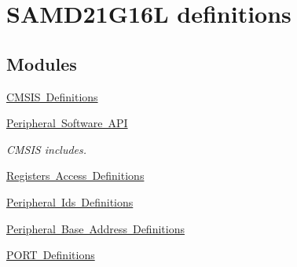 \hypertarget{group___s_a_m_d21_g16_l__definitions}{}\section{S\+A\+M\+D21\+G16L definitions}
\label{group___s_a_m_d21_g16_l__definitions}
\subsection*{Modules}
\begin{DoxyCompactItemize}
\item 
\mbox{\hyperlink{group___s_a_m_d21_g16_l__cmsis}{C\+M\+S\+I\+S Definitions}}
\item 
\mbox{\hyperlink{group___s_a_m_d21_g16_l__api}{Peripheral Software A\+PI}}
\begin{DoxyCompactList}\small\item\em C\+M\+S\+IS includes. \end{DoxyCompactList}\item 
\mbox{\hyperlink{group___s_a_m_d21_g16_l__reg}{Registers Access Definitions}}
\item 
\mbox{\hyperlink{group___s_a_m_d21_g16_l__id}{Peripheral Ids Definitions}}
\item 
\mbox{\hyperlink{group___s_a_m_d21_g16_l__base}{Peripheral Base Address Definitions}}
\item 
\mbox{\hyperlink{group___s_a_m_d21_g16_l__port}{P\+O\+R\+T Definitions}}
\end{DoxyCompactItemize}
